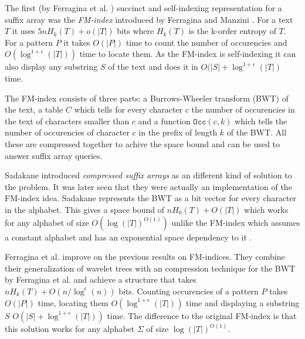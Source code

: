 \documentclass[11pt]{article}
\newcommand{\bigo}{O}
\newcommand{\smallo}{o}
\begin{document}
The first (by Ferragina et al. \cite{ferragina07}) succinct and
self-indexing representation for a suffix array was the
\emph{FM-index} introduced by Ferragina and Manzini
\cite{ferragina05}. For a text $T$ it uses $5nH_k(T) + \smallo(|T|)$
bits where $H_k(T)$ is the k-order entropy of $T$. For a pattern $P$
it takes $\bigo(|P|)$ time to count the number of occurencies and
$\bigo(\log^{1+\epsilon}(|T|))$ time to locate them. As the FM-index
is self-indexing it can also display any substring $S$ of the text and
does it in $\bigo(|S| + \log^{1+\epsilon}(|T|)$ time.

The FM-index consists of three parts: a Burrows-Wheeler transform
(BWT) \cite{burrows94} of the text, a table $C$ which tells for every
character $c$ the number of occurencies in the text of characters
smaller than $c$ and a function $\texttt{Occ}(c,k)$ which tells the
number of occurencies of character $c$ in the prefix of length $k$ of
the BWT. All these are compressed together to achive the space bound
and can be used to answer suffix array queries.

Sadakane introduced \emph{compressed suffix arrays} \cite{sadakane02}
as an different kind of solution to the problem. It was later seen
that they were actually an implementation of the FM-index idea.
Sadakane represents the BWT as a bit vector for every character in the
alphabet. This gives a space bound of $nH_0(T) + \bigo(|T|)$ which
works for any alphabet of size $\bigo(\log(|T|)^{\bigo(1)})$ unlike
the FM-index which assumes a constant alphabet and has an exponential
space dependency to it \cite{ferragina07}.

Ferragina et al. improve \cite{ferragina07} on the previous results on
FM-indices. They combine their generalization of wavelet trees with an
compression technique for the BWT by Ferragina et al.
\cite{ferragina05} and achieve a structure that takes $nH_k(T) +
\bigo(n / \log^{\epsilon}(n))$ bits. Counting occurencies of a pattern
$P$ takes $\bigo(|P|)$ time, locating them
$\bigo(\log^{1+\epsilon}(|T|))$ time and displaying a substring $S$
$\bigo(|S| + \log^{1+\epsilon}(|T|))$ time. The difference to the
original FM-index is that this solution works for any alphabet
$\Sigma$ of size $\log(|T|)^{\bigo(1)}$.
\end{document}
